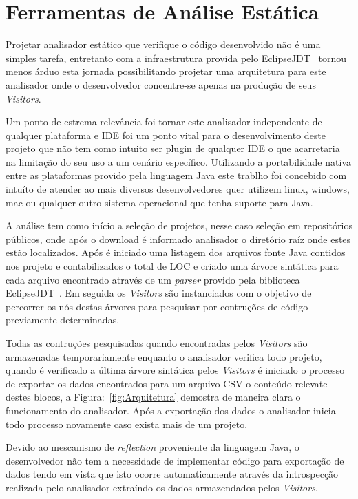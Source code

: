 \chapter {Ferramentas de Análise Estática}

Projetar analisador estático que verifique o código desenvolvido não é uma simples tarefa, entretanto com a infraestrutura provida pelo EclipseJDT~\cite{EclipseJDT} tornou menos árduo esta jornada possibilitando projetar uma arquitetura para este analisador onde o desenvolvedor concentre-se apenas na produção de seus \textit{Visitors}. 

Um ponto de estrema relevância foi tornar este analisador independente de qualquer plataforma e \acs{IDE} foi um ponto vital para o desenvolvimento deste projeto que não tem como intuito ser plugin de qualquer \acs{IDE} o que acarretaria na limitação do seu uso a um cenário específico. Utilizando a portabilidade nativa entre as plataformas provido pela linguagem Java este trablho foi concebido com intuíto de atender ao mais diversos desenvolvedores quer utilizem linux, windows, mac ou qualquer outro sistema operacional que tenha suporte para Java.

A análise tem como início a seleção de projetos, nesse caso seleção em repositórios públicos, onde após o download é informado analisador o diretório raíz onde estes estão localizados. Após é iniciado uma listagem dos arquivos fonte Java contidos nos projeto e contabilizados o total de \acs{LOC} e criado uma árvore sintática para cada arquivo encontrado através de um \textit{parser} provido pela biblioteca EclipseJDT~\cite{EclipseJDT}. Em seguida os \textit{Visitors} são instanciados com o objetivo de percorrer os nós destas árvores para pesquisar por contruções de código previamente determinadas.

Todas as contruções pesquisadas quando encontradas pelos \textit{Visitors} são armazenadas temporariamente enquanto o analisador verifica todo projeto, quando é verificado a última árvore sintática pelos \textit{Visitors} é iniciado o processo de exportar os dados encontrados para um arquivo \acs{CSV} o conteúdo relevate destes blocos, a Figura:~\ref{fig:Arquitetura} demostra de maneira clara o funcionamento do analisador. Após a exportação dos dados o analisador inicia todo processo novamente caso exista mais de um projeto.

Devido ao mescanismo de \textit{reflection} proveniente da linguagem Java, o desenvolvedor não tem a necessidade de implementar código para exportação de dados tendo em vista que isto ocorre automaticamente através da introspecção realizada pelo analisador extraíndo os dados armazendados pelos \textit{Visitors}.

